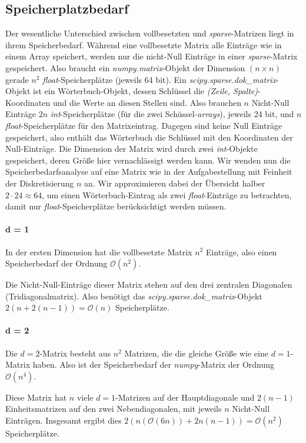 \documentclass[smallheadings]{scrartcl}
\numberwithin{equation}{section}
\begin{document}
\subsection{Speicherplatzbedarf}
\label{sec:bedarf}
Der wesentliche Unterschied zwischen vollbesetzten und \textit{sparse}-Matrizen  liegt in ihrem Speicherbedarf. Während eine vollbesetzte Matrix alle Einträge wie in einem Array speichert, werden nur die nicht-Null Einträge in einer \textit{sparse}-Matrix gespeichert. Also braucht ein \textit{numpy.matrix}-Objekt der Dimension $(n \times n)$ gerade $n^2$ \textit{float}-Speicherplätze (jeweils 64 bit). Ein \textit{scipy.sparse.dok\_matrix}-Objekt  ist ein Wörterbuch-Objekt, dessen Schlüssel die \textit{(Zeile, Spalte)}-Koordinaten und die Werte an diesen Stellen sind. 
Also brauchen $n$ Nicht-Null Einträge $2n$ \textit{int}-Speicherplätze (für die zwei Schüssel-\textit{arrays}), jeweils 24 bit, und $n$ \textit{float}-Speicherplätze für den Matrixeintrag. Dagegen sind keine Null Einträge gespeichert, also enthält das Wörterbuch die Schlüssel mit den Koordinaten der Null-Einträge. Die Dimension der Matrix wird durch zwei \textit{int}-Objekte gespeichert, deren Größe hier vernachlässigt werden kann. Wir wenden nun die Speicherbedarfsanalyse auf eine Matrix wie in der Aufgabestellung mit Feinheit der Diskretisierung $n$ an. Wir approximieren dabei der Übersicht halber $2 \cdot 24 \approx 64$, um einen Wörterbuch-Eintrag als zwei \textit{float}-Einträge zu betrachten, damit nur \textit{float}-Speicherplätze berücksichtigt werden müssen.

\paragraph{d = 1}
In der ersten Dimension hat die vollbesetzte Matrix $n^2$ Einträge, also einen Speicherbedarf der Ordnung $\mathcal{O}(n^2)$.

Die Nicht-Null-Einträge dieser Matrix stehen auf den drei zentralen Diagonalen (Tridiagonalmatrix). Also benötigt das \textit{scipy.sparse.dok\_matrix}-Objekt $2(n+2(n-1)) = \mathcal{O}(n)$ Speicherplätze.

\paragraph{d = 2}
Die $d=2$-Matrix besteht aus $n^2$ Matrizen, die die gleiche Größe wie eine $d=1$-Matrix haben. Also ist der Speicherbedarf der \textit{numpy}-Matrix der Ordnung $\mathcal{O}(n^4)$.

 Diese Matrix hat $n$ viele $d=1$-Matrizen auf der Hauptdiagonale  und $2(n-1)$ Einheitsmatrizen auf den zwei Nebendiagonalen, mit jeweils $n$ Nicht-Null Einträgen. Insgesamt ergibt dies $2(n(\mathcal{O}(6n))+2n(n-1))=\mathcal{O}(n^2)$ Speicherplätze.
 
\end{document}
